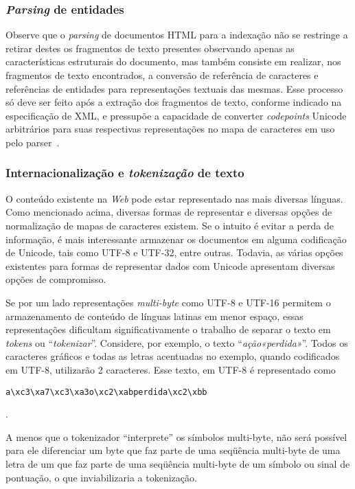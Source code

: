 \documentclass[10pt,twocolumn]{article}
\begin{document}
\subsubsection{\emph{Parsing} de entidades}

Observe que o \emph{parsing} de documentos HTML para a indexação não se
restringe a retirar destes os fragmentos de texto presentes observando
apenas as características estruturais do documento, mas também consiste
em realizar, nos fragmentos de texto encontrados, a conversão de
referência de caracteres e referências de entidades para representações
textuais das mesmas. Esse processo só deve ser feito após a extração dos
fragmentos de texto, conforme indicado na especificação de XML, e
pressupõe a capacidade de converter \emph{codepoints} Unicode
arbitrários para suas respectivas representações no mapa de caracteres
em uso pelo parser~\cite{bray2006xml}.

\subsubsection{Internacionalização e \emph{tokenização} de
texto}\label{prob:token}

O conteúdo existente na \emph{Web} pode estar representado nas mais
diversas línguas. Como mencionado acima, diversas formas de representar
e diversas opções de normalização de mapas de caracteres existem. Se o
intuito é evitar a perda de informação, é mais interessante armazenar os
documentos em alguma codificação de Unicode, tais como UTF-8 e UTF-32,
entre outras. Todavia, as várias opções existentes para formas de
representar dados com Unicode apresentam diversas opções de
compromisso.

Se por um lado representações \emph{multi-byte} como UTF-8 e UTF-16
permitem o armazenamento de conteúdo de línguas latinas em menor espaço,
essas representações dificultam significativamente o trabalho de separar
o texto em \emph{tokens} ou ``\emph{tokenizar}''. Considere, por
exemplo, o texto ``\emph{ação«perdida»}''. Todos os caracteres gráficos
e todas as letras acentuadas no exemplo, quando codificados em UTF-8,
utilizarão 2 caracteres. Esse texto, em UTF-8 é representado como
\begin{small}
\begin{verbatim}a\xc3\xa7\xc3\xa3o\xc2\xabperdida\xc2\xbb\end{verbatim}.
\end{small}
A menos que o
tokenizador ``interprete'' os símbolos multi-byte, não será possível
para ele diferenciar um byte que faz parte de uma seqüência
multi-byte de uma letra de um que faz parte de uma seqüência multi-byte
de um símbolo ou sinal de pontuação, o que inviabilizaria a tokenização.
\end{document}
